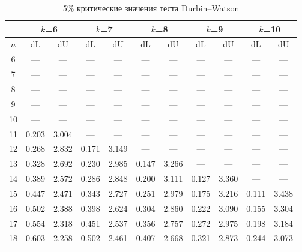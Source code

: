 \documentclass[12pt]{article}
\begin{document}
\begin{table}
\caption{5\% критические значения теста Durbin--Watson}
\begin{center}


{\footnotesize
\begin{tabular}{|c|c|c|c|c|c|c|c|c|c|c|}
  \hline


 & \multicolumn{2}{c|}{$k$=6}& \multicolumn{2}{c|}{$k$=7} &
 \multicolumn{2}{c|}{$k$=8} & \multicolumn{2}{c|}{$k$=9}&
 \multicolumn{2}{c|}{$k$=10}\\ \hline

$n$ & dL& dU& dL &dU &dL &dU& dL& dU& dL& dU\\ \hline

6&---&---&---&---&---&
---&---&---&---&---\\


7&---&---&---&---&---&
---&---&---&---&---\\


8&---&---&---&---&---&
---&---&---&---&---\\


9&---&---&---&---&---&
---&---&---&---&---\\


10&---&---&---&---&---&
---&---&---&---&---\\


11&0.203&3.004&---&---&
---&---&---&---&---&---\\


12&0.268&2.832&0.171&3.149&---&---&
---&---&---&---\\


13&0.328&2.692&0.230&2.985&0.147&3.266&---&---&
---&---\\


14&0.389&2.572&0.286&2.848&0.200&3.111&0.127&3.360&---&---\\


15&0.447&
2.471&0.343&2.727&0.251&2.979&0.175&3.216&0.111&3.438\\


16&0.502&2.388&0.398&
2.624&0.304&2.860&0.222&3.090&0.155&3.304\\


17&0.554&2.318&0.451&2.537&0.356&
2.757&0.272&2.975&0.198&3.184\\


18&0.603&2.258&0.502&2.461&0.407&2.668&0.321&
2.873&0.244&3.073\\



\end{tabular}}
\end{center}
\end{table}
\end{document}
